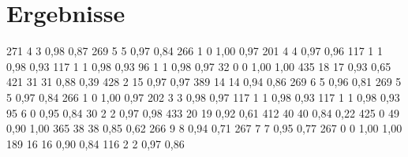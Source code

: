 \section{Ergebnisse}
 \begin{table}[p]
  \centering
  \begin{datatabular}
     {271} {4} {3} {0,98} {0,87}
     {269} {5} {5} {0,97} {0,84}
     {266} {1} {0} {1,00} {0,97}
     {201} {4} {4} {0,97} {0,96}
     {117} {1} {1} {0,98} {0,93}
     {117} {1} {1} {0,98} {0,93}
     {96} {1} {1} {0,98} {0,97}
     {32} {0} {0} {1,00} {1,00}
     {435} {18} {17} {0,93} {0,65}
     {421} {31} {31} {0,88} {0,39}
     {428} {2} {15} {0,97} {0,97}
     {389} {14} {14} {0,94} {0,86}
     {269} {6} {5} {0,96} {0,81}
     {269} {5} {5} {0,97} {0,84}
     {266} {1} {0} {1,00} {0,97}
     {202} {3} {3} {0,98} {0,97}
     {117} {1} {1} {0,98} {0,93}
     {117} {1} {1} {0,98} {0,93}
     {95} {6} {0} {0,95} {0,84}
     {30} {2} {2} {0,97} {0,98}
     {433} {20} {19} {0,92} {0,61}
     {412} {40} {40} {0,84} {0,22}
     {425} {0} {49} {0,90} {1,00}
     {365} {38} {38} {0,85} {0,62}
     {266} {9} {8} {0,94} {0,71}
     {267} {7} {7} {0,95} {0,77}
     {267} {0} {0} {1,00} {1,00}
     {189} {16} {16} {0,90} {0,84}
     {116} {2} {2} {0,97} {0,86}

\end{datatabular}
\end{table}
